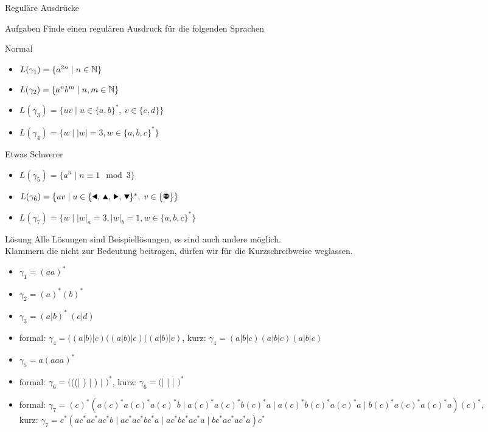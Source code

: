 {
\begin{frame}{Reguläre Ausdrücke}
    \begin{alertblock}{Aufgaben}
    Finde einen regulären Ausdruck für die folgenden Sprachen
    \end{alertblock}
    \begin{block}{Normal}
    \begin{itemize}
        \item $L(\gamma_1) = \{a^{2n} \mid n\in\mathbb{N}\}$
        \item $L(\gamma_2) = \{a^nb^m \mid n, m\in\mathbb{N}\}$
        \item $L(\gamma_3) = \{uv \mid u\in\{a,b\}^\ast,\ v\in\{c,d\}\}$
        \item $L(\gamma_4) = \{w \mid |w| = 3, w\in \{a,b,c\}^*\}$
    \end{itemize}
    \end{block}
    \begin{block}{Etwas Schwerer}
    \begin{itemize}
        \item $L(\gamma_5) = \{a^n \mid n \equiv 1 \mod 3\}$
        \item $L(\gamma_6) = \{uv\mid u\in\{\text{\Rewind, \MoveUp, \Forward, \MoveDown}\}^\ast,\;v\in\{\text{\Stopsign}\}\}$
        \item $L(\gamma_7) = \{w \mid |w|_a = 3, |w|_b = 1, w\in \{a,b,c\}^*\}$
    \end{itemize}
    \end{block}
\end{frame}
}

{
\begin{frame}{Lösung}
    Alle Lösungen sind Beispiellösungen, es sind auch andere möglich.\\
    Klammern die nicht zur Bedeutung beitragen, dürfen wir für die Kurzschreibweise weglassen.
    \begin{itemize}[<+- | alert@+>]
        \item $\gamma_1 = (aa)^*$
        \item $\gamma_2 = (a)^*(b)^*$
        \item $\gamma_3 = (a|b)^*\ (c|d)$
        \item formal: $\gamma_4 = ((a|b)|c)((a|b)|c)((a|b)|c)$, kurz: $\gamma_4 = (a|b|c)(a|b|c)(a|b|c)$
        \item $\gamma_5 = a(aaa)^*$
        \item formal: $\gamma_6 = ($((\Rewind | \MoveUp) | \Forward) | \MoveDown$)^*$\Stopsign, kurz: $\gamma_6 = ($\Rewind | \MoveUp | \Forward | \MoveDown$)^*$\Stopsign
        \item formal: $\gamma_7 = (c)^*(a(c)^*a(c)^*a(c)^*b\mid a(c)^*a(c)^*b(c)^*a\mid a(c)^*b(c)^*a(c)^*a\mid b(c)^*a(c)^*a(c)^*a)(c)^*$,\\kurz: $\gamma_7 = c^*(ac^*ac^*ac^*b\mid ac^*ac^*bc^*a\mid ac^*bc^*ac^*a\mid bc^*ac^*ac^*a)c^*$ 
    \end{itemize}
\end{frame}
}

